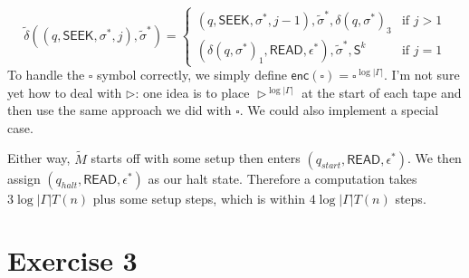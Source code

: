 \documentclass[12pt]{article}
\begin{document}
$$
\tilde{\delta}
((q, \textsf{SEEK}, \sigma^*, j), \tilde{\sigma}^*) =
\begin{cases}
(q, \textsf{SEEK}, \sigma^*, j-1),  \tilde{\sigma}^*, \delta(q,\sigma^*)_3 &
\text{if } j > 1 \\
(\delta(q,\sigma^*)_1, \textsf{READ}, \epsilon^*), \tilde{\sigma}^*, \textsf{S}^k &
\text{if } j = 1
\end{cases}
$$
To handle the $\square$ symbol correctly, we simply define $\textsf{enc}(\square) = \square^{\log|\Gamma|}$. I'm not sure yet how to deal with $\triangleright$: one idea is to place $\triangleright^{\log|\Gamma|}$ at the start of each tape and then use the same approach we did with $\square$. We could also implement a special case. 

\noindent
Either way, $\tilde{M}$ starts off with some setup then enters $(q_{start}, \textsf{READ}, \epsilon^*)$. We then assign $(q_{halt}, \textsf{READ}, \epsilon^*)$ as our halt state. Therefore a computation takes $3\log|\Gamma|T(n)$ plus some setup steps, which is within $4\log|\Gamma|T(n)$ steps.

\section*{Exercise 3}

\end{document}
